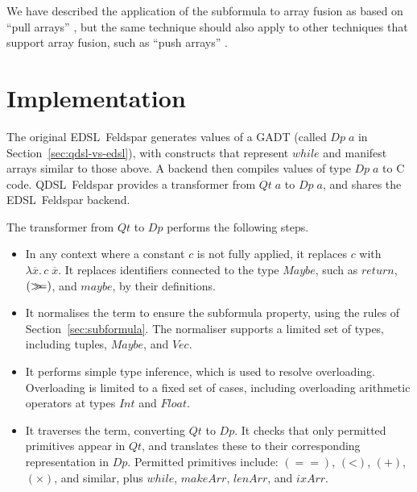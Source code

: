 \documentclass[authoryear,9pt]{sigplanconf}
\newcommand{\Conid}[1]{\mathit{#1}}
\newcommand{\Varid}[1]{\mathit{#1}}
\newcommand{\bind}{\mathbin{>\!\!\!>\mkern-6.7mu=}}
\newcommand{\longeq}{=\!=}
\newcommand{\app}{\;}
\newcommand{\expabs}[3]{\lambda#1.\,#3}
\begin{document}
We have described the application of the subformula to array
fusion as based on ``pull arrays'' \citep{svenningsson:combining},
but the same technique should also apply to other techniques that
support array fusion, such as ``push arrays'' \citep{claessen:push}.


\section{Implementation}
\label{sec:implementation}

The original EDSL~Feldspar generates values of a GADT
(called \ensuremath{\Conid{Dp}\;\Varid{a}} in Section~\ref{sec:qdsl-vs-edsl}), with constructs
that represent \ensuremath{\Varid{while}} and manifest arrays similar to those
above. A backend then compiles values of type \ensuremath{\Conid{Dp}\;\Varid{a}} to C code.
QDSL~Feldspar provides a transformer from \ensuremath{\Conid{Qt}\;\Varid{a}} to \ensuremath{\Conid{Dp}\;\Varid{a}}, and
shares the EDSL~Feldspar backend.

The transformer from \ensuremath{\Conid{Qt}} to \ensuremath{\Conid{Dp}} performs the following steps.
\begin{itemize}
\item In any context where a constant $c$ is not fully applied,
  it replaces $c$ with $\expabs{\overline{x}}{}{c \app \overline{x}}$.
  It replaces identifiers connected to the type \ensuremath{\Conid{Maybe}}, such as
  \ensuremath{\Varid{return}}, \ensuremath{(\bind )}, and \ensuremath{\Varid{maybe}}, by their definitions.
\item It normalises the term to ensure the subformula property, using
  the rules of Section~\ref{sec:subformula}. The normaliser supports
  a limited set of types, including tuples, \ensuremath{\Conid{Maybe}}, and \ensuremath{\Conid{Vec}}.
\item It performs simple type inference, which is used to resolve
  overloading. Overloading is limited to a fixed set of
  cases, including overloading arithmetic operators at types
  \ensuremath{\Conid{Int}} and \ensuremath{\Conid{Float}}.
\item It traverses the term, converting \ensuremath{\Conid{Qt}} to \ensuremath{\Conid{Dp}}.
  It checks that only permitted primitives appear in \ensuremath{\Conid{Qt}},
  and translates these to their corresponding representation
  in \ensuremath{\Conid{Dp}}. Permitted primitives include:
  \ensuremath{(\longeq )}, \ensuremath{(\mathbin{<})}, \ensuremath{(\mathbin{+})}, \ensuremath{(\times)}, and similar, plus
  \ensuremath{\Varid{while}}, \ensuremath{\Varid{makeArr}}, \ensuremath{\Varid{lenArr}}, and \ensuremath{\Varid{ixArr}}.
\end{itemize}
\end{document}
